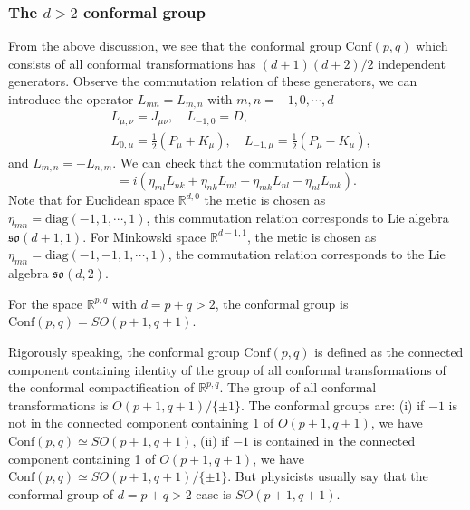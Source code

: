 \documentclass[graybox,envcountchap,sectrefs]{svmono}
\begin{document}
\subsubsection{The $d>2$ conformal group}

From the above discussion, we see that the conformal group $\mathrm{Conf}(p,q)$ which consists of all conformal transformations has $(d+1)(d+2)/2$ independent generators. Observe the commutation relation of these generators, we can introduce the operator $L_{mn}=L_{m,n}$ with $m,n=-1,0,\cdots,d$
\begin{align}
&L_{\mu,\nu}=J_{\mu\nu},\quad L_{-1,0}=D,\\
&L_{0,\mu}=\frac{1}{2}(P_{\mu}+K_{\mu}),\quad L_{-1,\mu}=\frac{1}{2}(P_{\mu}-K_{\mu}),
\end{align}
and $L_{m,n}=-L_{n,m}$. We can check that the commutation relation is 
\begin{equation}
[L_{mn},L_{kl}]=i(\eta_{ml}L_{nk}+\eta_{nk}L_{ml}-\eta_{mk}L_{nl}-\eta_{nl}L_{mk}).
\end{equation}
Note that for Euclidean space $\mathbb{R}^{d,0}$ the metic is chosen as $\eta_{mn}=\mathrm{diag}(-1,1,\cdots,1)$, this commutation relation corresponds to Lie algebra $\mathfrak{so}(d+1,1)$. For Minkowski space $\mathbb{R}^{d-1,1}$, the metic is chosen as $\eta_{mn}=\mathrm{diag}(-1,-1,1,\cdots,1)$, the commutation relation corresponds to the Lie algebra $\mathfrak{so}(d,2)$.

\begin{svgraybox}
\begin{theorem}
For the space $\mathbb{R}^{p,q}$ with $d=p+q>2$, the conformal group is $\mathrm{Conf}(p,q)=SO(p+1,q+1)$.
\end{theorem}
\end{svgraybox}
\begin{remark}
	Rigorously speaking, the conformal group $\mathrm{Conf}(p,q)$ is defined as the connected component containing identity of the group of all conformal transformations of the conformal compactification of $\mathbb{R}^{p,q}$. The group of all conformal transformations is
		$O(p+1,q+1)/\{\pm 1\}$. The conformal groups are: (i) if $-1$ is not in the
		connected component containing 1 of
		$O(p+1,q+1)$, we have 
		$\mathrm{Conf}(p,q)\simeq SO(p+1,q+1)$, 
		(ii) if $-1$ is contained in the connected
		component containing 1 of $O(p+1,q+1)$, 
		we have 
		$\mathrm{Conf}(p,q)\simeq SO(p+1,q+1)/\{\pm 1\}$. But physicists usually say that the conformal group of $d=p
		+q>2$ case is $SO(p+1,q+1)$.
\end{remark}
\end{document}

